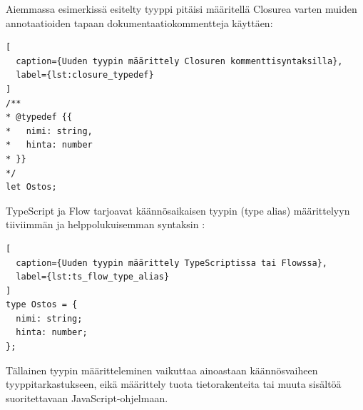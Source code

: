 Aiemmassa esimerkissä esitelty tyyppi  pitäisi
määritellä Closurea varten muiden annotaatioiden tapaan dokumentaatiokommentteja käyttäen:

\begin{lstlisting}[
  caption={Uuden tyypin määrittely Closuren kommenttisyntaksilla},
  label={lst:closure_typedef}
]
/**
* @typedef {{
*   nimi: string,
*   hinta: number
* }}
*/
let Ostos;
\end{lstlisting}
TypeScript ja Flow tarjoavat käännösaikaisen tyypin (type alias)
määrittelyyn tiiviimmän ja helppolukuisemman syntaksin \cite{TypeScriptSpec}:
\begin{lstlisting}[
  caption={Uuden tyypin määrittely TypeScriptissa tai Flowssa},
  label={lst:ts_flow_type_alias}
]
type Ostos = {
  nimi: string;
  hinta: number;
};
\end{lstlisting}
Tällainen tyypin määritteleminen vaikuttaa ainoastaan käännösvaiheen
tyyppitarkastukseen, eikä määrittely tuota tietorakenteita tai muuta
sisältöä suoritettavaan JavaScript-ohjelmaan.

